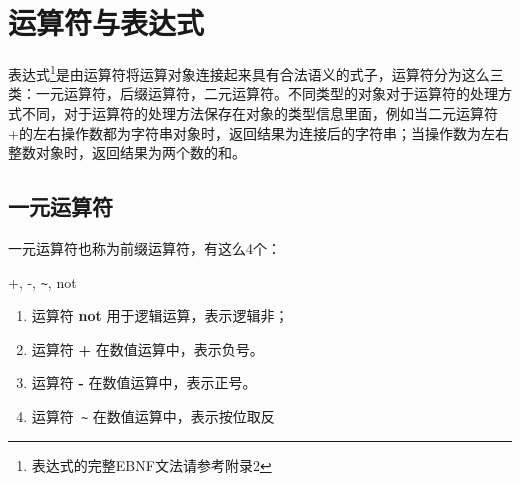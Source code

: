 \section{运算符与表达式}
表达式\footnote{表达式的完整EBNF文法请参考附录2}是由运算符将运算对象连接起来具有合法语义的式子，运算符分为这么三类：一元运算符，后缀运算符，二元运算符。不同类型的对象对于运算符的处理方式不同，对于运算符的处理方法保存在对象的类型信息里面，例如当二元运算符+的左右操作数都为字符串对象时，返回结果为连接后的字符串；当操作数为左右整数对象时，返回结果为两个数的和。

\subsection{一元运算符}
一元运算符也称为前缀运算符，有这么4个：\begin{textbf}+, -, \verb|~|, not\end{textbf}
\begin{enumerate}
\item 运算符\textbf{ not} 用于逻辑运算，表示逻辑非；
\item 运算符\textbf{ +} 在数值运算中，表示负号。
\item 运算符\textbf{ -} 在数值运算中，表示正号。
\item 运算符\verb| ~| 在数值运算中，表示按位取反
\end{enumerate}
